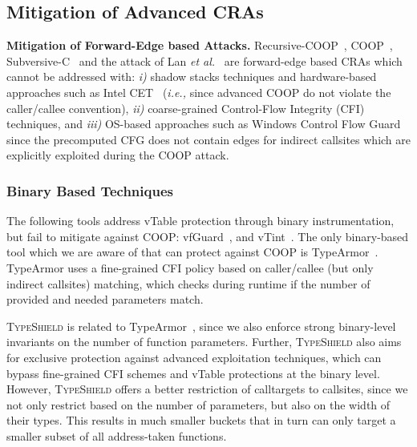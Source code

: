 \subsection{Mitigation of Advanced CRAs}
\textbf{Mitigation of Forward-Edge based Attacks.}
\label{Mitigation of Advanced Code-Reuse Attacks}
Recursive-COOP~\cite{crane:readactor++}, COOP~\cite{schuster:coop}, Subversive-C~\cite{subversive-c:lettner} and the attack of Lan \textit{et al.}~\cite{loop:oriented} are 
forward-edge based CRAs which cannot be addressed with:
\textit{i)}  shadow stacks techniques and hardware-based approaches such as Intel CET~\cite{intel:cet} (\textit{i.e.,} since advanced COOP do not violate 
the caller/callee convention), 
\textit{ii)} coarse-grained Control-Flow Integrity (CFI)~\cite{abadi:cfi2, abadi:cfi} techniques, and 
\textit{iii)} OS-based approaches such as Windows Control Flow Guard~\cite{windows:cfguard} 
since the precomputed CFG does not contain edges for indirect callsites which are explicitly exploited during the COOP attack.

\subsubsection{Binary Based Techniques}
The following tools address vTable protection through binary instrumentation, 
but fail to mitigate against COOP: vfGuard~\cite{vfuard:aravind}, and vTint~\cite{vtint:zhang}. 
The only binary-based tool which we are aware of that can protect against COOP is TypeArmor~\cite{veen:typearmor}. 
TypeArmor uses a fine-grained CFI policy based on caller/callee (but only indirect callsites) matching, which checks 
during runtime if the number of provided and needed parameters match.

\textsc{TypeShield} is related to TypeArmor~\cite{veen:typearmor}, since we also enforce strong binary-level 
invariants on the number of function parameters. Further, \textsc{TypeShield} also aims for exclusive protection 
against advanced exploitation techniques, which can bypass fine-grained CFI schemes and vTable protections at the 
binary level. However, \textsc{TypeShield} offers a better restriction of calltargets to callsites, since we not 
only restrict based on the number of parameters, but also on the width of their types. This results in much smaller 
buckets that in turn can only target a smaller subset of all address-taken functions. 

